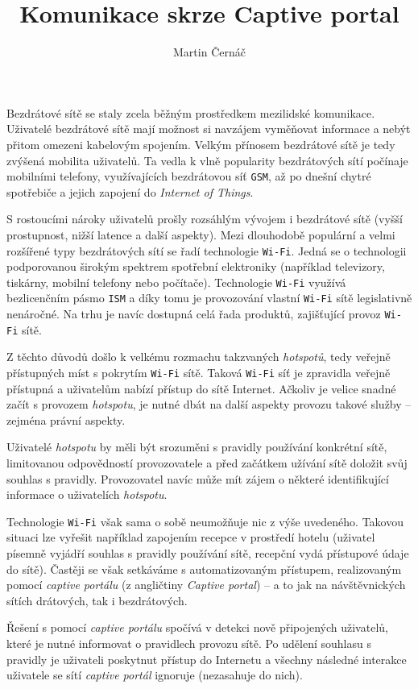 \documentclass[thesis=M,czech]{FITthesis}[2012/10/20]
\title{Komunikace skrze Captive portal}
\author{Martin Černáč} %
\begin{document}
\begin{introduction}
Bezdrátové sítě se staly zcela běžným prostředkem mezilidské komunikace. Uživatelé bezdrátové sítě mají možnost si navzájem vyměňovat informace a nebýt přitom omezeni kabelovým spojením. Velkým přínosem bezdrátové sítě je tedy zvýšená mobilita uživatelů. Ta vedla k vlně popularity bezdrátových sítí počínaje mobilními telefony, využívajících bezdrátovou síť \texttt{GSM}, až po dnešní chytré spotřebiče a jejich zapojení do \textit{Internet of Things}.

S rostoucími nároky uživatelů prošly rozsáhlým vývojem i bezdrátové sítě (vyšší prostupnost, nižší latence a další aspekty). Mezi dlouhodobě populární a velmi rozšířené typy bezdrátových sítí se řadí technologie \texttt{Wi-Fi}. Jedná se o technologii podporovanou širokým spektrem spotřební elektroniky (například televizory, tiskárny, mobilní telefony nebo počítače). Technologie \texttt{Wi-Fi} využívá bezlicenčním pásmo \texttt{ISM} a díky tomu je provozování vlastní \texttt{Wi-Fi} sítě legislativně nenáročné. Na trhu je navíc dostupná celá řada produktů, zajišťující provoz \texttt{Wi-Fi} sítě.

Z těchto důvodů došlo k velkému rozmachu takzvaných \textit{hotspotů}, tedy veřejně přístupných míst s pokrytím \texttt{Wi-Fi} sítě. Taková \texttt{Wi-Fi} síť je zpravidla veřejně přístupná a uživatelům nabízí přístup do sítě Internet. Ačkoliv je velice snadné začít s provozem \textit{hotspotu}, je nutné dbát na další aspekty provozu takové služby -- zejména právní aspekty.

Uživatelé \textit{hotspotu} by měli být srozuměni s pravidly používání konkrétní sítě, limitovanou odpovědností provozovatele a před začátkem užívání sítě doložit svůj souhlas s pravidly. Provozovatel navíc může mít zájem o některé identifikující informace o uživatelích \textit{hotspotu}.

Technologie \texttt{Wi-Fi} však sama o sobě neumožňuje nic z výše uvedeného. Takovou situaci lze vyřešit například zapojením recepce v prostředí hotelu (uživatel písemně vyjádří souhlas s pravidly používání sítě, recepční vydá přístupové údaje do sítě). Častěji se však setkáváme s automatizovaným přístupem, realizovaným pomocí \textit{captive portálu} (z angličtiny \textit{Captive portal}) -- a to jak na návštěvnických sítích drátových, tak i bezdrátových.

Řešení s pomocí \textit{captive portálu} spočívá v detekci nově připojených uživatelů, které je nutné informovat o pravidlech provozu sítě. Po udělení souhlasu s pravidly je uživateli poskytnut přístup do Internetu a všechny následné interakce uživatele se sítí \textit{captive portál} ignoruje (nezasahuje do nich).


\end{introduction}
\end{document}
